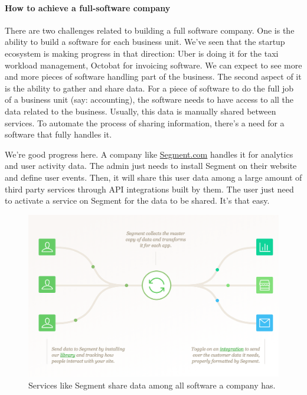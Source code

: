 \documentclass[12pt]{article}
\begin{document}
\smallskip

\paragraph{How to achieve a full-software company}

There are two challenges related to building a full software company. One is the
ability to build a software for each business unit. We've seen that the startup
ecosystem is making progress in that direction: Uber is doing it for the taxi
workload management, Octobat for invoicing software. We can expect to see more
and more pieces of software handling part of the business. The second aspect of
it is the ability to gather and share data. For a piece of software to do the
full job of a business unit (say: accounting), the software needs to have access
to all the data related to the business. Usually, this data is manually shared
between services. To automate the process of sharing information, there's a need
for a software that fully handles it.

We're good progress here. A company like
\href{https://segment.com/}{Segment.com} handles it for analytics and user
activity data. The admin just needs to install Segment on their website and
define user events. Then, it will share this user data among a large amount of
third party services through API integrations built by them. The user just need
to activate a service on Segment for the data to be shared. It's that easy.

\smallskip

\begin{figure}[ht]
    \centering
    \includegraphics[scale=0.5]{segment}
    \caption{Services like Segment share data among all software a company has.}
    \label{fig:segment}
\end{figure}
\end{document}
